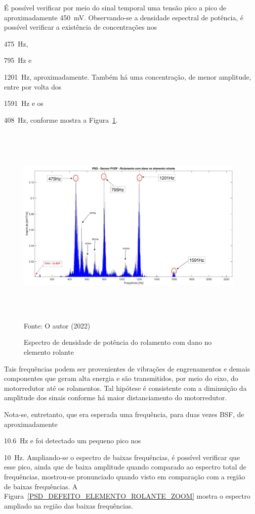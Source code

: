 \documentclass[
	12pt,				
	oneside,			
	a4paper,			
	english,			
	brazil,			
	]{abntex2ppgsi}
\begin{document}
{{{{{{{{{{{{{{{{É possível verificar por meio do sinal temporal uma tensão pico a pico de aproximadamente {\SI{450}{\milli\volt}}. Observando-se a densidade espectral de potência, é possível verificar a existência de concentrações nos {\SI{475}{\hertz}, {\SI{795}{\hertz} e {\SI{1201}{\hertz}, aproximadamente. Também há uma concentração, de menor amplitude, entre por volta dos {\SI{1591}{\hertz} e os {\SI{408}{\hertz}, conforme mostra a Figura~\ref{PSD_DEFEITO_ELEMENTO_ROLANTE_anotado}. 

\begin{figure}[H]
\centering
\caption {Espectro de densidade de potência do rolamento com dano no elemento rolante}
\includegraphics[width=\textwidth,height=100mm,keepaspectratio]{PSD_PVDF_rolamento_dano_rolante} \\
Fonte: O autor (2022)
\label{PSD_DEFEITO_ELEMENTO_ROLANTE_anotado}
\end{figure} 

Tais frequências podem ser provenientes de vibrações de engrenamentos e demais componentes que geram alta energia e são transmitidos, por meio do eixo, do motorredutor até os rolamentos. Tal hipótese é consistente com a diminuição da amplitude dos sinais conforme há maior distanciamento do motorredutor. 

Nota-se, entretanto, que era esperada uma frequência, para duas vezes BSF, de aproximadamente {\SI{10,6}{\hertz} e foi detectado um pequeno pico nos {\SI{10}{\hertz}. Ampliando-se o espectro de baixas frequências, é possível verificar que esse pico, ainda que de baixa amplitude quando comparado ao espectro total de frequências, mostrou-se pronunciado quando visto em comparação com a região de baixas frequências. A Figura~\ref{PSD_DEFEITO_ELEMENTO_ROLANTE_ZOOM} mostra o espectro ampliado na região das baixas frequências.

}}}}}}}}}}}}}}}}}}}}}}}
\end{document}
